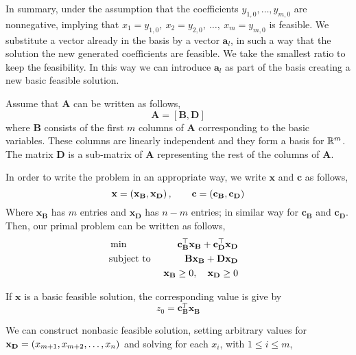 In summary, under the assumption that the coefficients $y_{1,0},\dots, y_{m,0}$ are nonnegative, implying that $x_1=y_{1,0},\ x_2=y_{2,0},\ \dots,\ x_m=y_{m,0}$ is feasible. We substitute a vector already in the basis by a vector $\mathbf{a}_l$, in such a way that the solution the new generated coefficients are feasible. We take the smallest ratio to keep the feasibility. In this way we can introduce $\mathbf{a}_l$ as part of the basis creating a new basic feasible solution. 


Assume that $\mathbf{A}$ can be written as follows,
\begin{equation}
	\mathbf{A}=[\mathbf{B}, \mathbf{D}]
\end{equation}
where $\mathbf{B}$ consists of the first $m$ columns of $\mathbf{A}$ corresponding to the basic variables. These columns are linearly independent and they form a basis for $\mathbb{R}^m$. The matrix $\mathbf{D}$ is a sub-matrix  of $\mathbf{A}$ representing the rest of the columns of $\mathbf{A}$.

In order to write the problem in an appropriate way, we write $\mathbf{x}$ and $\mathbf{c}$ as follows,
\begin{equation}
	\mathbf{x}=\left( \mathbf{x}_\mathbf{B}, \mathbf{x}_{\mathbf{D}} \right), \qquad \mathbf{c}=\left( \mathbf{c}_{\mathbf{B}}, \mathbf{c}_{\mathbf D} \right)
\end{equation}
Where $\mathbf{x}_{\mathbf{B}}$ has $m$ entries and $\mathbf{x}_{\mathbf{D}}$ has $n-m$ entries; in similar way for $\mathbf{c}_{\mathbf{B}}$ and $\mathbf{c}_{\mathbf D}$. Then, our primal problem can be written as follows,
\begin{align*}
	&\min &\mathbf{c}_{\mathbf{B}}^\top\mathbf{x}_{\mathbf{B}} + \mathbf{c}_\mathbf{D}^\top \mathbf{x}_\mathbf{D}&\\
	&\text{subject to }  &\mathbf{B}\mathbf{x}_{\mathbf{B}}+\mathbf{D}\mathbf{x}_{\mathbf{D}}& &\\
	& &\mathbf{x}_{\mathbf{B}}\geq 0, \quad \mathbf{x}_{\mathbf{D}}\geq 0 & &
\end{align*}


If $\mathbf{x}$ is a basic feasible solution, the corresponding value is give by
\begin{equation*}
	z_0=\mathbf{c}_{\mathbf{B}}^T\mathbf{x}_{\mathbf{B}}
\end{equation*}

We can construct nonbasic feasible solution, setting arbitrary values for $\mathbf{x}_{\mathbf{D}}=\left( x_{m+1}, x_{m+2},\dots, x_{n} \right)$ and solving for each $x_i$, with $1\leq i\leq m$,

